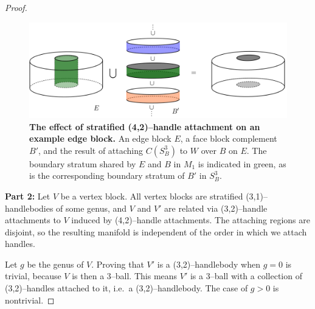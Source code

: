 \begin{proof}
	\begin{figure}[h!]
		\centering
		\includegraphics[width=\textwidth]{figures/edge-face-shared-boundary.png}
		\caption{
			\textbf{The effect of stratified (4,2)--handle attachment on an example edge block.}
			An edge block $E$, a face block complement $B'$, and the result of attaching $C(S_B^3)$ to $W$ over $B$ on $E$.
			The boundary stratum shared by $E$ and $B$ in $M_1$ is indicated in green, as is the corresponding boundary stratum of $B'$ in $S_B^3$.
		}
		\label{fig:edge-face-shared-boundary}
	\end{figure}
	
	\textbf{Part 2:}
	Let $V$ be a vertex block.
	All vertex blocks are stratified (3,1)--handlebodies of some genus, and
	$V$ and $V'$ are related via (3,2)--handle attachments to $V$ induced by (4,2)--handle attachments.
	The attaching regions are disjoint, so the resulting manifold is independent of the order in which we attach handles.
	
	
	Let $g$ be the genus of $V$.
	Proving that $V'$ is a (3,2)--handlebody when $g=0$ is trivial, because $V$ is then a 3--ball.
	This means $V'$ is a 3--ball with a collection of (3,2)--handles attached to it, i.e.\ a (3,2)--handlebody.
	The case of $g>0$ is nontrivial.
	

\end{proof}
